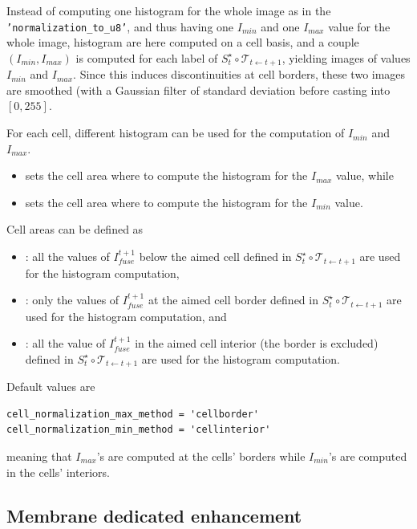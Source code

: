 \begin{itemize}
Instead of computing one histogram for the whole image as in the \texttt{'normalization\_to\_u8'}, and thus having one $I_{min}$ and one $I_{max}$ value for the whole image, histogram are here computed on a cell basis, and a couple $(I_{min}, I_{max})$ is computed for each label of $S^{\star}_t \circ \mathcal{T}_{t \leftarrow t+1}$, yielding images of values $I_{min}$ and $I_{max}$. Since this induces discontinuities at cell borders, these two images are smoothed (with a Gaussian filter of standard deviation  before casting into $[0, 255]$.

For each cell, different histogram can be used for the computation of $I_{min}$ and $I_{max}$.
\begin{itemize}
\itemsep -0.5ex
\item {} sets the cell area where to compute the histogram for the $I_{max}$ value, while
\item {} sets the cell area where to compute the histogram for the $I_{min}$ value.
\end{itemize}

Cell areas can be defined as
\begin{itemize}
\itemsep -0.5ex
\item {}: all the values of $I^{t+1}_{fuse}$ below the aimed cell defined in $S^{\star}_t \circ \mathcal{T}_{t \leftarrow t+1}$ are used for the histogram computation, 
\item {}: only the values of $I^{t+1}_{fuse}$ at the aimed cell border defined in $S^{\star}_t \circ \mathcal{T}_{t \leftarrow t+1}$ are used for the histogram computation, and 
\item {}: all the value of $I^{t+1}_{fuse}$ in the aimed cell interior (the border is excluded) defined in $S^{\star}_t \circ \mathcal{T}_{t \leftarrow t+1}$ are used for the histogram computation.
\end{itemize}

Default values are 
\begin{verbatim}
cell_normalization_max_method = 'cellborder'
cell_normalization_min_method = 'cellinterior'
\end{verbatim}
meaning that $I_{max}$'s are computed at the cells' borders while $I_{min}$'s are computed in the cells' interiors. 
\end{itemize}


\subsection{Membrane dedicated enhancement}
\label{sec:cli:input:image:preprocessing:membrane}

